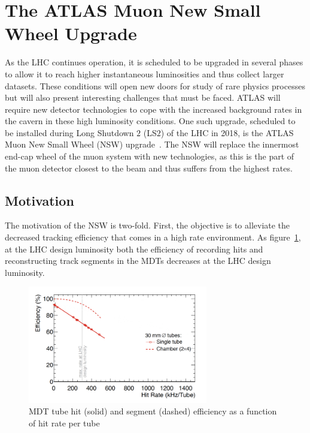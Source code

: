 \section{The ATLAS Muon New Small Wheel Upgrade}

As the LHC continues operation, it is scheduled to be upgraded in several phases to allow it to reach higher instantaneous luminosities and thus collect larger datasets. These conditions will open new doors for study of rare physics processes but will also present interesting challenges that must be faced. ATLAS will require new detector technologies to cope with the increased background rates in the cavern in these high luminosity conditions. One such upgrade, scheduled to be installed during Long Shutdown $2$ (LS$2$) of the LHC in 2018, is the ATLAS Muon New Small Wheel (NSW) upgrade~\cite{NSW_TDR}. The NSW will replace the innermost end-cap wheel of the muon system with new technologies, as this is the part of the muon detector closest to the beam and thus suffers from the highest rates. 

\subsection{Motivation}

The motivation of the NSW is two-fold. First, the objective is to alleviate the decreased tracking efficiency that comes in a high rate environment. As figure~\ref{fig:mdt_hit_rate}, at the LHC design luminosity both the efficiency of recording hits and reconstructing track segments in the MDTs decreases at the LHC design luminosity. 

\begin{figure}[h!]
  \centering
  \captionsetup{justification=centering}

  \includegraphics[width=0.7\textwidth]{figures/MDT_hit_rate}
   \caption{MDT tube hit (solid) and segment (dashed) efficiency as a function of hit rate per tube~\cite{NSW_TDR}}
  \label{fig:mdt_hit_rate}
\end{figure}

